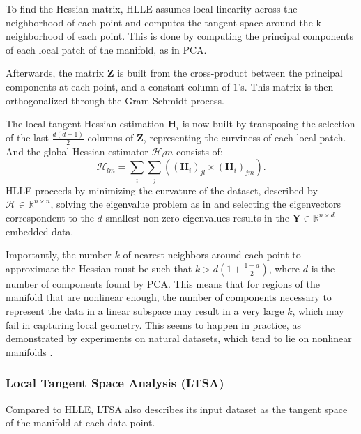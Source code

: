             To find the Hessian matrix, \ac{HLLE} assumes local linearity across the neighborhood of each point and computes the tangent space around the k-neighborhood of each point. This is done by computing the principal components of each local patch of the manifold, as in \ac{PCA}.

            Afterwards, the matrix $\boldsymbol{Z}$ is built from the cross-product between the principal components at each point, and a constant column of $1$'s. This matrix is then orthogonalized through the Gram-Schmidt process.

            The local tangent Hessian estimation $\boldsymbol{H}_i$ is now built by transposing the selection of the last $\frac{d(d+1)}{2}$ columns of $\boldsymbol{Z}$, representing the curviness of each local patch. And the global Hessian estimator $\boldsymbol{\mathcal{H}}_lm$ consists of:
            \begin{equation}
                \boldsymbol{\mathcal{H}}_{lm} = \sum_{i} \sum_{j} \left((\boldsymbol{H}_i)_{jl} \times (\boldsymbol{H}_i)_{jm}\right).
            \end{equation}
            \ac{HLLE} proceeds by minimizing the curvature of the dataset, described by $\boldsymbol{\mathcal{H}} \in \mathbb{R}^{n\times n}$, solving the eigenvalue problem as in  and selecting the eigenvectors correspondent to the $d$ smallest non-zero eigenvalues results in the $\boldsymbol{Y} \in\mathbb{R}^{n\times d}$ embedded data.

            Importantly, the number $k$ of nearest neighbors around each point to approximate the Hessian must be such that $k > d (1 + \frac{1 + d}{2})$, where $d$ is the number of components found by \ac{PCA}. This means that for regions of the manifold that are nonlinear enough, the number of components necessary to represent the data in a linear subspace may result in a very large $k$, which may fail in capturing local geometry. This seems to happen in practice, as demonstrated by experiments on natural datasets, which tend to lie on nonlinear manifolds \cite{hlle}.

        \subsubsection{Local Tangent Space Analysis (LTSA)}
            Compared to \ac{HLLE}, \ac{LTSA} \cite{ltsa}  also describes its input dataset as the tangent space of the manifold at each data point.


